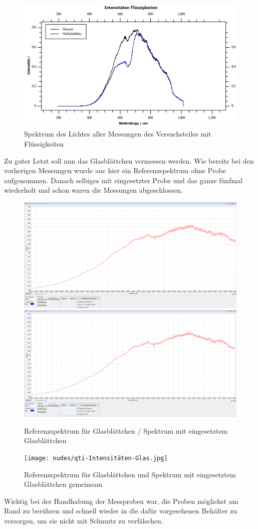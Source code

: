 \documentclass[12pt,a4paper,twoside]{article}
\begin{document}
\begin{figure}[H]
    \centering
    \includegraphics[width=0.6\linewidth]{nudes/qti-Intensitäten-Flüssigkeiten.jpg}
    \caption{Spektrum des Lichtes aller Messungen des Versuchsteiles mit Flüssigkeiten}
    \label{fig:Alle3.2Bilder}
\end{figure}

\noindent
Zu guter Letzt soll nun das Glasblättchen vermessen werden. Wie bereits bei den vorherigen Messungen wurde auc hier ein Referenzspektrum ohne Probe aufgenommen. Danach selbiges mit eingesetzter Probe und das ganze fünfmal wiederholt und schon waren die Messungen abgeschlossen. 

\begin{figure}[H]
    \centering
    \includegraphics[width=0.4\linewidth]{nudes/Verlauf-ReferenzspektrumGlas.PNG}
    \includegraphics[width=0.4\linewidth]{nudes/Verlauf-Glas.PNG}
    \caption{Referenzspektrum für Glasblättchen / Spektrum mit eingesetztem Glasblättchen}
    \label{fig:MessungenGlas}
\end{figure}

\begin{figure}[H]
    \centering
    \texttt{[image: nudes/qti-Intensitäten-Glas.jpg]}
    \caption{Referenzspektrum für Glasblättchen und Spektrum mit eingesetztem Glasblättchen gemeinsam}
    \label{fig:Alle3.5Bilder}
\end{figure}

\noindent
Wichtig bei der Handhabung der Messproben war, die Proben möglichst am Rand zu berühren und schnell wieder in die dafür vorgesehenen Behälter zu versorgen, um sie nicht mit Schmutz zu verfälschen.
\end{document}
